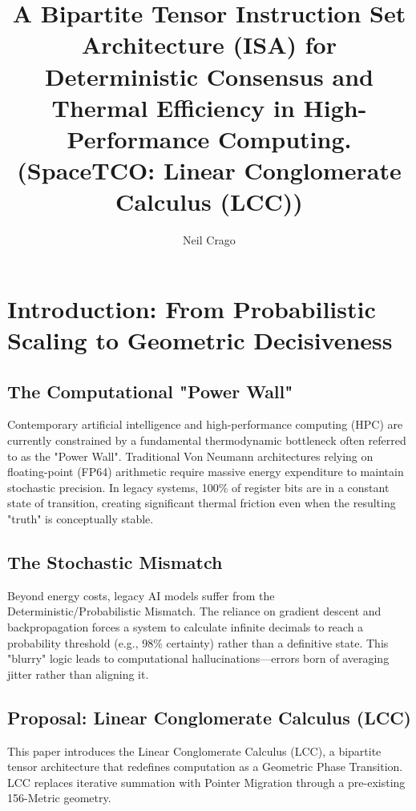 \documentclass[fleqn,10pt,lineno]{wlpeerj}
\title{\Huge \textbf{A Bipartite Tensor Instruction Set Architecture (ISA) for Deterministic Consensus and Thermal Efficiency in High-Performance Computing.
}\\[1em]
\Large{(SpaceTCO: Linear Conglomerate Calculus (LCC))}}
\author[1]{Neil Crago}
\affil[1]{Independent Researcher: SpaceTCO}
\begin{document}
\flushbottom
\maketitle
\thispagestyle{empty}

\section*{Introduction: From Probabilistic Scaling to Geometric Decisiveness}

\subsection*{The Computational "Power Wall"}
Contemporary artificial intelligence and high-performance computing (HPC) are currently constrained by a fundamental thermodynamic bottleneck often referred to as the "Power Wall". 
Traditional Von Neumann architectures relying on floating-point (FP64) arithmetic require massive energy expenditure to maintain stochastic precision. 
In legacy systems, 100\% of register bits are in a constant state of transition, creating significant thermal friction even when the resulting "truth" is conceptually stable.

\subsection*{The Stochastic Mismatch}
Beyond energy costs, legacy AI models suffer from the Deterministic/Probabilistic Mismatch. 
The reliance on gradient descent and backpropagation forces a system to calculate infinite decimals to reach a probability threshold (e.g., 98\% certainty) rather than a definitive state. 
This "blurry" logic leads to computational hallucinations—errors born of averaging jitter rather than aligning it.

\subsection*{Proposal: Linear Conglomerate Calculus (LCC)}
This paper introduces the Linear Conglomerate Calculus (LCC), a bipartite tensor architecture that redefines computation as a Geometric Phase Transition. 
LCC replaces iterative summation with Pointer Migration through a pre-existing 156-Metric geometry. 
\end{document}
